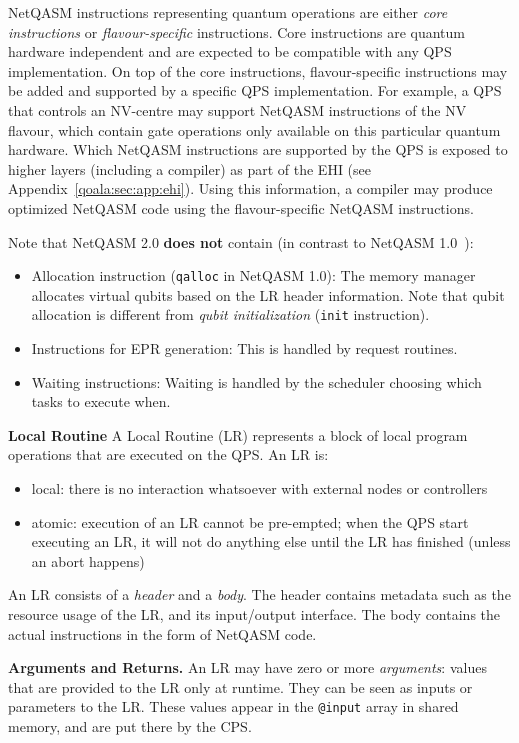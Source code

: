 NetQASM instructions representing quantum operations are either \textit{core instructions} or \textit{flavour-specific} instructions.
Core instructions are quantum hardware independent and are expected to be compatible with any QPS implementation. On top of the core instructions, flavour-specific instructions may be added and supported by a specific QPS implementation. For example, a QPS that controls an NV-centre may support NetQASM instructions of the NV flavour, which contain gate operations only available on this particular quantum hardware. Which NetQASM instructions are supported by the QPS is exposed to higher layers (including a compiler) as part of the EHI (see Appendix~\ref{qoala:sec:app:ehi}). Using this information, a compiler may produce optimized NetQASM code using the flavour-specific NetQASM instructions.


Note that NetQASM 2.0 \textbf{does not} contain (in contrast to NetQASM 1.0~\cite{dahlberg2022netqasm}):
\begin{itemize}
\item Allocation instruction (\texttt{qalloc} in NetQASM 1.0): The memory manager allocates virtual qubits based on the LR header information. Note that qubit allocation is different from \textit{qubit initialization} (\texttt{init} instruction).
\item Instructions for EPR generation: This is handled by request routines.
\item Waiting instructions: Waiting is handled by the scheduler choosing which tasks to execute when.
\end{itemize}

\textbf{Local Routine}
A Local Routine (LR) represents a block of local program operations that are executed on the QPS. An LR is:
\begin{itemize}
\item local: there is no interaction whatsoever with external nodes or controllers
\item atomic: execution of an LR cannot be pre-empted; when the QPS start executing an LR, it will not do anything else until the LR has finished (unless an abort happens)
\end{itemize}

An LR consists of a \textit{header} and a \textit{body}. The header contains metadata such as the resource usage of the LR, and its input/output interface. The body contains the actual instructions in the form of NetQASM code.


\textbf{Arguments and Returns.}
An LR may have zero or more \textit{arguments}: values that are provided to the LR only at runtime.
They can be seen as inputs or parameters to the LR.
These values appear in the \texttt{@input} array in shared memory, and are put there by the CPS.

